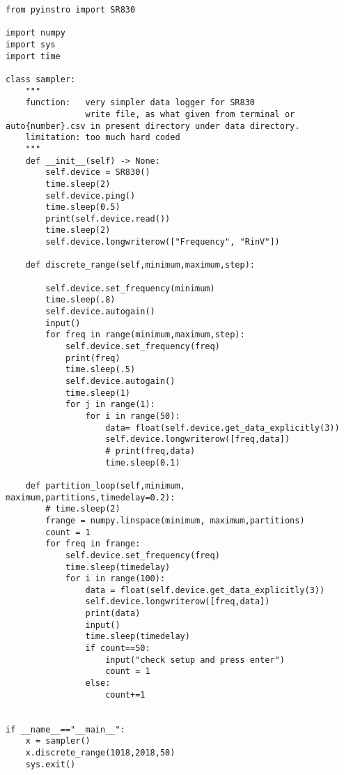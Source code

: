 \begin{verbatim}
from pyinstro import SR830

import numpy
import sys
import time

class sampler:
    """
    function:   very simpler data logger for SR830
                write file, as what given from terminal or auto{number}.csv in present directory under data directory.
    limitation: too much hard coded
    """
    def __init__(self) -> None:
        self.device = SR830()
        time.sleep(2)
        self.device.ping()
        time.sleep(0.5)
        print(self.device.read())
        time.sleep(2)
        self.device.longwriterow(["Frequency", "RinV"])

    def discrete_range(self,minimum,maximum,step):
        
        self.device.set_frequency(minimum)
        time.sleep(.8)
        self.device.autogain()
        input()
        for freq in range(minimum,maximum,step):
            self.device.set_frequency(freq)
            print(freq)
            time.sleep(.5)
            self.device.autogain()
            time.sleep(1)
            for j in range(1):
                for i in range(50):
                    data= float(self.device.get_data_explicitly(3))
                    self.device.longwriterow([freq,data])
                    # print(freq,data)
                    time.sleep(0.1)

    def partition_loop(self,minimum, maximum,partitions,timedelay=0.2):
        # time.sleep(2)
        frange = numpy.linspace(minimum, maximum,partitions)
        count = 1
        for freq in frange:
            self.device.set_frequency(freq)
            time.sleep(timedelay)
            for i in range(100):
                data = float(self.device.get_data_explicitly(3))
                self.device.longwriterow([freq,data])
                print(data)
                input()
                time.sleep(timedelay)
                if count==50:
                    input("check setup and press enter")
                    count = 1
                else:
                    count+=1

    
if __name__=="__main__":
    x = sampler()
    x.discrete_range(1018,2018,50)
    sys.exit()

\end{verbatim}
            

